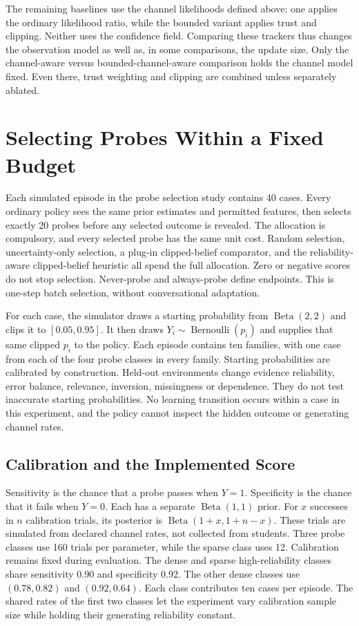 The remaining baselines use the channel likelihoods defined above: one applies the ordinary likelihood ratio, while the
bounded variant applies trust and clipping. Neither uses the confidence field. Comparing these trackers thus changes the
observation model as well as, in some comparisons, the update size. Only the channel-aware versus bounded-channel-aware
comparison holds the channel model fixed. Even there, trust weighting and clipping are combined unless separately ablated.

\section{Selecting Probes Within a Fixed Budget}
\label{sec:probe-selection}

Each simulated episode in the probe selection study contains 40 cases. Every ordinary policy sees the same prior estimates and permitted features, then
selects exactly 20 probes before any selected outcome is revealed. The allocation is compulsory, and every selected probe has
the same unit cost. Random selection,
uncertainty-only selection, a plug-in clipped-belief comparator, and the reliability-aware clipped-belief heuristic all spend
the full allocation. Zero or negative scores do not stop selection. Never-probe and always-probe define endpoints. This is
one-step batch selection, without conversational adaptation.

For each case, the simulator draws a starting probability from $\operatorname{Beta}(2,2)$ and clips it to $[0.05,0.95]$.
It then draws $Y_i\sim\operatorname{Bernoulli}(p_i)$ and supplies that same clipped $p_i$ to the policy. Each episode contains
ten families, with one case from each of the four probe classes in every family. Starting
probabilities are calibrated by construction. Held-out environments change evidence reliability, error balance, relevance,
inversion, missingness or dependence. They do not test inaccurate starting probabilities. No learning transition occurs within
a case in this experiment, and the policy cannot inspect the hidden outcome or generating channel rates.

\subsection{Calibration and the Implemented Score}

Sensitivity is the chance that a probe passes when $Y=1$. Specificity is the chance that it fails when $Y=0$. Each has a separate
$\operatorname{Beta}(1,1)$ prior. For $x$ successes in $n$ calibration trials, its posterior is
$\operatorname{Beta}(1+x,1+n-x)$. These trials are simulated from declared channel rates, not collected from students.
Three probe classes use 160 trials per parameter, while the sparse class uses 12. Calibration remains fixed during evaluation.
The dense and sparse high-reliability classes share sensitivity 0.90 and specificity 0.92. The other dense classes use
$(0.78,0.82)$ and $(0.92,0.64)$. Each class contributes ten cases per episode. The shared rates of the first two classes let
the experiment vary calibration sample size while holding their generating reliability constant.

